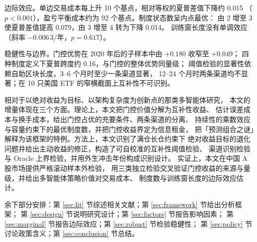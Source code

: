 边际效应。单边交易成本每上升 10 个基点，相对等权的夏普差值下降约 0.015
（$p<0.001$），盈亏平衡成本约为 92 个基点。制度状态数呈内点最优：
由 2 增至 3 使夏普差值提高 0.079，由 3 增至 4 转为下降 0.014。
训练窗长度没有单调效应（斜率 $-0.006\,3$/年，$p=0.617$）。

稳健性与边界。门控优势在 2020 年后的子样本中由 $+0.180$ 收窄至 $+0.049$；
四种制度定义下夏普跨度约 0.16，与门控的整体优势同量级；
阈值检验的显著性依赖自助区块长度，3--6 个月时至少一条渠道显著，
12--24 个月时两条渠道均不显著；在 10 只美国 ETF 的窄横截面上互补性不可识别。

相对于以绝对收益为目标、以架构复杂度为创新点的那类多智能体研究，
本文的增量体现在三个方面。理论上，本文把门控价值分解为互补性收益、
估计误差成本与换手成本，给出门控占优的充要条件、两条渠道的分离、
持续性的乘数效应与容量约束下的最优制度数，并把门控收益界定为信息租金，
把「预测组合之谜」解释为该框架的特例。方法上，本文识别了满仓长仓约束下
绝对收益目标的退化问题并给出主动收益的修正，构造了可自校准的互补性阈值检验、
渠道识别检验与 Oracle 上界检验，并用外生冲击年份构成识别设计。
实证上，本文在中国 A 股市场提供严格滚动样本外检验，
用三类独立检验交叉验证门控收益的来源与量级，并给出多智能体策略价值对交易成本、
制度数与训练窗长度的边际效应估计。

余下部分安排：第 \ref{sec:lit} 节综述相关文献；第 \ref{sec:framework} 节给出分析框架；
第 \ref{sec:design} 节说明研究设计；第 \ref{sec:factors} 节报告影响因素；
第 \ref{sec:marginal} 节报告边际效应；第 \ref{sec:robust} 节检验稳健性；
第 \ref{sec:policy} 节讨论政策含义；第 \ref{sec:conclusion} 节总结。
